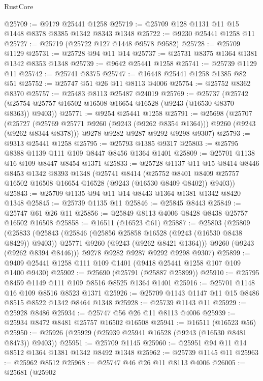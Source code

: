 \begin{lexlean}{RustCore}
\begin{coremodule}
@25709 := @9179 @25441 @1258
@25719 := @25709 @128 @1131 @11 @15 @1448 @8378 @8385 @1342 @8343 @1348
@25722 := @9230 @25441 @1258 @11
@25727 := @25719 (@25722 @127 @1448 @9578 @9582)
@25728 := @25709 @1129
@25731 := @25728 @94 @11 @14
@25737 := @25731 @8375 @1364 @1381 @1342 @8353 @1348
@25739 := @9642 @25441 @1258
@25741 := @25739 @1129 @11
@25742 := @25741 @8375
@25747 := @16448 @25441 @1258 @1385 @82 @51
@25752 := @25747 @51 @26 @11 @8113 @4006
@25754 := @25752 @8362 @8370
@25757 := @25483 @8113 @25487 @24019
@25769 := @25737
    (@25742 (@25754 @25757 @16502 @16508 @16654 @16528 (@9243 (@16530 @8370 @8363)) @9403))
@25771 := @9254 @25441 @1258
@25791 := @25698
    (@25707
      (@25727 (@25769 @25771 @9260 (@9243 (@9262 @8354 @1364))) @9260 (@9243 (@9262 @8344 @8378)))
      @9278
      @9282
      @9287
      @9292
      @9298
      @9307)
@25793 := @9313 @25441 @1258
@25795 := @25793 @1385 @9317
@25803 := @25795 @8388 @1139 @111 @109 @8447 @8456 @1364 @1401
@25809 := @25701 @1138 @16 @109 @8447 @8454 @1371
@25833 := @25728
    @1137
    @11
    @15
    @8414
    @8446
    @8453
    @1342
    @8393
    @1348
    (@25741
      @8414
      (@25752 @8401 @8409 @25757 @16502 @16508 @16654 @16528 (@9243 (@16530 @8409 @8402)) @9403))
@25843 := @25709 @1135 @94 @11 @14 @8443 @1364 @1381 @1342 @8420 @1348
@25845 := @25739 @1135 @11
@25846 := @25845 @8443
@25849 := @25747 @61 @26 @11
@25856 := @25849 @8113 @4006 @8428 @8438 @25757 @16502 @16508
@25858 := @16511 (@16523 @61)
@25887 := @25803
    (@25809
      (@25833
        (@25843
          (@25846 (@25856 @25858 @16528 (@9243 (@16530 @8438 @8429)) @9403))
          @25771
          @9260
          (@9243 (@9262 @8421 @1364)))
        @9260
        (@9243 (@9262 @8394 @8446)))
      @9278
      @9282
      @9287
      @9292
      @9298
      @9307)
@25899 := @9409 @25441 @1258 @111 @109 @1401 (@9418 @25441 @1258 @107 @109 @1400 @9430)
@25902 := @25690 (@25791 (@25887 @25899))
@25910 := @25795 @8459 @1149 @111 @109 @8516 @8525 @1364 @1401
@25916 := @25701 @1148 @16 @109 @8516 @8523 @1371
@25926 := @25709 @1143 @1147 @11 @15 @8486 @8515 @8522 @1342 @8464 @1348
@25928 := @25739 @1143 @11
@25929 := @25928 @8486
@25934 := @25747 @56 @26 @11 @8113 @4006
@25939 := @25934 @8472 @8481 @25757 @16502 @16508
@25941 := @16511 (@16523 @56)
@25950 := @25926 (@25929 (@25939 @25941 @16528 (@9243 (@16530 @8481 @8473)) @9403))
@25951 := @25709 @1145
@25960 := @25951 @94 @11 @14 @8512 @1364 @1381 @1342 @8492 @1348
@25962 := @25739 @1145 @11
@25963 := @25962 @8512
@25968 := @25747 @46 @26 @11 @8113 @4006
@26005 := @25681
    (@25902

\end{coremodule}
\end{lexlean}
